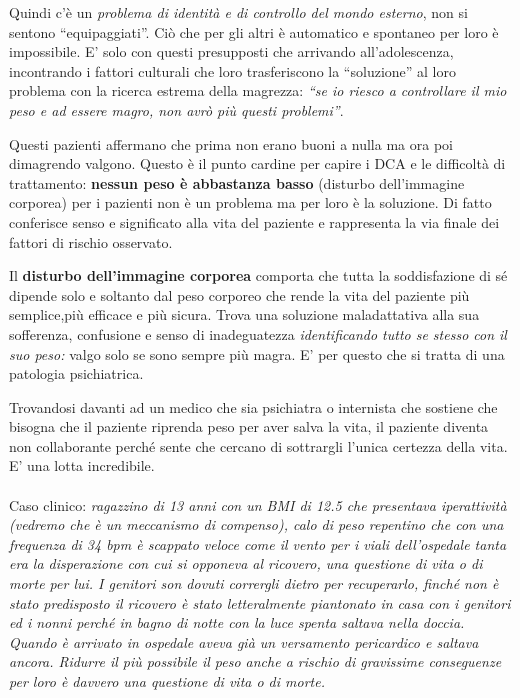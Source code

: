 Quindi c'è un \emph{problema di identità e di controllo del mondo
esterno}, non si sentono ``equipaggiati''. Ciò che per gli altri è
automatico e spontaneo per loro è impossibile. E' solo con questi
presupposti che arrivando all'adolescenza, incontrando i fattori
culturali che loro trasferiscono la ``soluzione'' al loro problema con
la ricerca estrema della magrezza: \emph{``se io riesco a controllare il
mio peso e ad essere magro, non avrò più questi problemi''}.

Questi pazienti affermano che prima non erano buoni a nulla ma ora poi
dimagrendo valgono. Questo è il punto cardine per capire i DCA e le
difficoltà di trattamento: \textbf{nessun peso è abbastanza basso}
(disturbo dell'immagine corporea) per i pazienti non è un problema ma
per loro è la soluzione. Di fatto conferisce senso e significato alla
vita del paziente e rappresenta la via finale dei fattori di rischio
osservato.

Il \textbf{disturbo dell'immagine corporea} comporta che tutta la
soddisfazione di sé dipende solo e soltanto dal peso corporeo che rende
la vita del paziente più semplice,più efficace e più sicura. Trova una
soluzione maladattativa alla sua sofferenza, confusione e senso di
inadeguatezza \emph{identificando tutto se stesso con il suo peso:}
valgo solo se sono sempre più magra. E' per questo che si tratta di una
patologia psichiatrica.

Trovandosi davanti ad un medico che sia psichiatra o internista che
sostiene che bisogna che il paziente riprenda peso per aver salva la
vita, il paziente diventa non collaborante perché sente che cercano di
sottrargli l'unica certezza della vita. E' una lotta incredibile.
\\\\
Caso clinico: \emph{ragazzino di 13 anni con un BMI di 12.5 che
presentava iperattività (vedremo che è un meccanismo di compenso), calo
di peso repentino che con una frequenza di 34 bpm è scappato veloce come
il vento per i viali dell'ospedale tanta era la disperazione con cui si
opponeva al ricovero, una questione di vita o di morte per lui. I
genitori son dovuti corrergli dietro per recuperarlo, finché non è stato
predisposto il ricovero è stato letteralmente piantonato in casa con i
genitori ed i nonni perché in bagno di notte con la luce spenta saltava
nella doccia. Quando è arrivato in ospedale aveva già un versamento
pericardico e saltava ancora. Ridurre il più possibile il peso anche a
rischio di gravissime conseguenze per loro è davvero una questione di
vita o di morte.}

